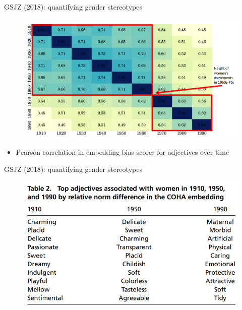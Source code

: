 \documentclass[usenames,dvipsnames,english]{beamer}
\begin{document}
\begin{frame}{GSJZ (2018): quantifying gender stereotypes}
\begin{figure}
    \centering
    \includegraphics[scale = 0.6]{Images/gsjz_quantify1.png}
\end{figure}
\begin{itemize}
    \item {\small Pearson correlation in embedding bias scores for adjectives over time}
\end{itemize}
\end{frame}
\begin{frame}{GSJZ (2018): quantifying gender stereotypes}
\begin{figure}
    \centering
    \includegraphics[scale = 0.5]{Images/gsjz_quantify2.png}
\end{figure}
\end{frame}
\end{document}
